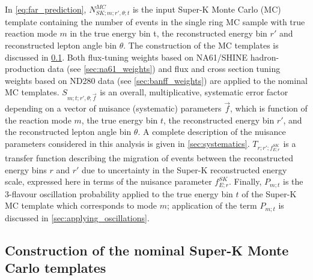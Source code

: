 In \cref{eq:far_prediction}, $N_{SK;m;r\prime,\theta;t}^{MC}$ is the input Super-K Monte Carlo (MC) template 
containing the number of events in the single ring MC sample with true reaction mode $m$ in the 
true energy bin t, the reconstructed energy bin $r\prime$ and reconstructed lepton angle bin $\theta$.
The construction of the MC templates is discussed in \cref{sec:mc_templates}.
Both flux-tuning weights based on NA61/SHINE hadron-production data (see \cref{sec:na61_weights})
and flux and cross section tuning weights based on ND280 data (see \cref{sec:banff_weights})
are applied to the nominal MC templates.
$S_{m;t;r\prime,\theta;\vec{f}}$ is an overall, multiplicative, systematic error factor 
depending on a vector of nuisance (systematic) parameters $\vec{f}$,
which is function of the reaction mode $m$, the true energy bin $t$, the reconstructed energy bin $r\prime$,
and the reconstructed lepton angle bin $\theta$.
A complete description of the nuisance parameters considered in this analysis is given in \cref{sec:systematics}.
$T_{r;r\prime;f_{E; r}^{SK}}$ is a transfer function describing the migration of events
between the reconstructed energy bins $r$ and $r\prime$ due to uncertainty in the Super-K reconstructed energy
scale, expressed here in terms of the nuisance parameter $f_{E; r}^{SK}$.
Finally, $P_{m;t}$ is the 3-flavour oscillation probability applied to the true energy
bin \(t\) of the Super-K MC template which corresponds to mode $m$;
application of the term $P_{m;t}$ is discussed in \cref{sec:applying_oscillations}.


\subsection {Construction of the nominal Super-K Monte Carlo templates}
\label{sec:mc_templates}

